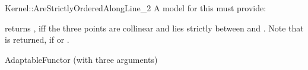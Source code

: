 \begin{ccRefFunctionObjectConcept}{Kernel::AreStrictlyOrderedAlongLine_2}
A model for this must provide:


          {returns , iff the three points are collinear and 
           lies strictly between  and .
          Note that  is returned, if  or
          .}

\ccRefines
AdaptableFunctor (with three arguments)

\ccSeeAlso
{}  \\

\end{ccRefFunctionObjectConcept}         

